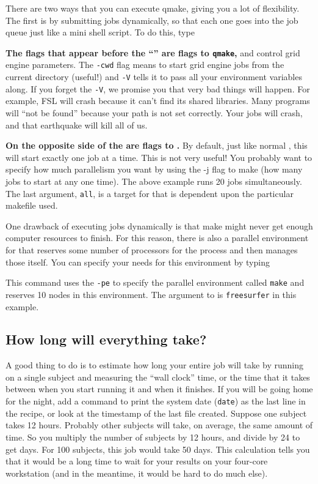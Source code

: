 There are two ways that you can execute qmake, giving you a lot of flexibility. The first is by submitting jobs dynamically, so that each one goes into the job queue just like a mini shell script. To do this, type

\textbf{The flags that appear before the ``\dd{}'' are flags to \texttt{qmake},} and control grid engine parameters. The \texttt{-cwd} flag means to start grid engine jobs from the current directory (useful!) and \texttt{-V} tells it to pass all your environment variables along. If you forget the \texttt{-V}, we promise you that very bad things will happen. For example, FSL will crash because it can't find its shared libraries. Many programs will ``not be found'' because your path is not set correctly. Your jobs will crash, and that earthquake will kill all of us.

\textbf{On the opposite side of the \dd{} are flags to \maken.} By default, just like normal \maken, this will start exactly one job at a time. This is not very useful! You probably want to specify how much parallelism you want by using the -j flag to make (how many jobs to start at any one time). The above example runs 20 jobs simultaneously. The last argument, \texttt{all}, is a target for \maken{} that is dependent upon the particular makefile used.

One drawback of executing jobs dynamically is that make might never get enough computer resources to finish. For this reason, there is also a parallel environment for \maken{} that reserves some number of processors for the \maken{} process and then manages those itself. You can specify your needs for this environment by typing

This command uses the \texttt{-pe} to specify the parallel environment called \texttt{make} and reserves 10 nodes in this environment. The argument to \maken{} is \texttt{freesurfer} in this example.

\subsection{How long will everything take?}

A good thing to do is to estimate how long your entire job will take by running \maken{} on a single subject and measuring the ``wall clock'' time, or the time that it takes between when you start running it and when it finishes. If you will be going home for the night, add a command to print the system date (\texttt{date}) as the last line in the recipe, or look at the timestamp of the last file created. Suppose one subject takes 12 hours. Probably other subjects will take, on average, the same amount of time. So you multiply the number of subjects by 12 hours, and divide by 24 to get days. For 100 subjects, this job would take 50 days. This calculation tells you that it would be a long time to wait for your results on your four-core workstation (and in the meantime, it would be hard to do much else). 

